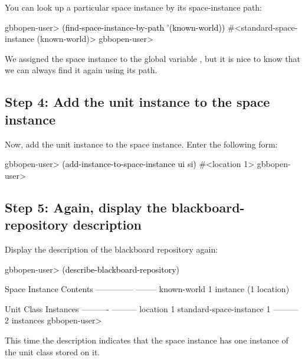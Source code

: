 \documentclass[10pt,twoside,english,pdftex]{article}
\begin{document}
%
%
%
You can look up a particular space instance by its space-instance path:
%
\W\supp
\begin{example}
\textcolor{darkergray}{%
  gbbopen-user> \textcolor{black}{(find-space-instance-by-path '(known-world))}
  #<standard-space-instance (known-world)>
  gbbopen-user>}
\end{example}

We assigned the  space instance to the global variable
, but it is nice to know that we can always find it again using its
path.

\subsection*{Step 4: Add the unit instance to the space instance}

%
%
%
Now, add the  unit instance to the space instance.
Enter the following form:
%
\W\supp
\begin{example}
\textcolor{darkergray}{%
  gbbopen-user> \textcolor{black}{(add-instance-to-space-instance ui si)}
  #<location 1>
  gbbopen-user>}
\end{example}

\subsection*{Step 5: Again, display the blackboard-repository description}

%
Display the description of the blackboard repository again:
%
\W\supp
\begin{example}
\textcolor{darkergray}{%
  gbbopen-user> \textcolor{black}{(describe-blackboard-repository)}
  
  Space Instance                Contents
  --------------                --------
  known-world                   1 instance (1 location)

  Unit Class                    Instances
  ----------                    ---------
  location                              1
  standard-space-instance               1
                                ---------
                                        2 instances
  gbbopen-user>}
\end{example}

This time the description indicates that the  space
instance has one instance of the  unit class stored on
it.
\end{document}
